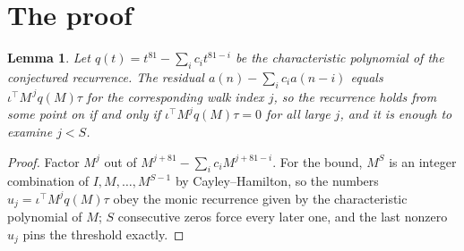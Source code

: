 \documentclass[11pt,a4paper]{article}
\theoremstyle{plain}
\newtheorem{lemma}[theorem]{Lemma}
\theoremstyle{definition}
\begin{document}
\section{The proof}

\begin{lemma}\label{lem:crit}
Let $q(t)=t^{81}-\sum_i c_it^{81-i}$ be the characteristic polynomial of the
conjectured recurrence. The residual $a(n)-\sum_ic_ia(n-i)$ equals
$\iota^{\!\top}M^{\,j}q(M)\tau$ for the corresponding walk index $j$, so the recurrence
holds from some point on if and only if $\iota^{\!\top}M^{j}q(M)\tau=0$ for all large $j$,
and it is enough to examine $j<S$.
\end{lemma}

\begin{proof}
Factor $M^{j}$ out of $M^{j+81}-\sum_ic_iM^{j+81-i}$. For the bound, $M^{S}$
is an integer combination of $I,M,\dots,M^{S-1}$ by Cayley--Hamilton, so the numbers
$u_j=\iota^{\!\top}M^{j}q(M)\tau$ obey the monic recurrence given by the characteristic
polynomial of $M$; $S$ consecutive zeros force every later one, and the last nonzero $u_j$
pins the threshold exactly.
\end{proof}
\end{document}
